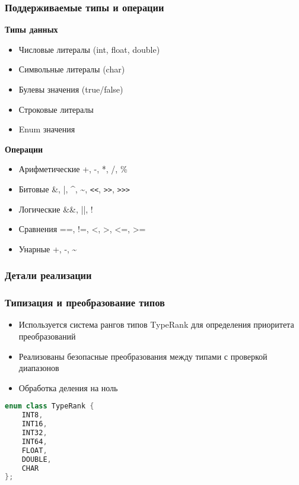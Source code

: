 \subsubsection{Поддерживаемые типы и операции}
\textbf{Типы данных}
\begin{itemize}[label={--}]
    \item Числовые литералы (int, float, double)
    \item Символьные литералы (char)
    \item Булевы значения (true/false)
    \item Строковые литералы
    \item Enum значения
\end{itemize}

\textbf{Операции}
\begin{itemize}[label={--}]
    \item Арифметические  +, -, *, /, \%
    \item Битовые  \&, |, \^{}, \~{}, \verb|<<|, \verb|>>|, \verb|>>>|
    \item Логические  \&\&, ||, !
    \item Сравнения  ==, !=, <, >, <=, >=
    \item Унарные  +, -, \~{}
\end{itemize}

\subsubsection{Детали реализации}
\subsubsection*{Типизация и преобразование типов}
\begin{itemize}[label={--}]
    \item Используется система рангов типов TypeRank для определения приоритета преобразований
    \item Реализованы безопасные преобразования между типами с проверкой диапазонов
    \item Обработка деления на ноль
\end{itemize}

\begin{lstlisting}[language=C++,caption=Перечисление рангов типов]
enum class TypeRank {
    INT8,
    INT16,
    INT32,
    INT64,
    FLOAT,
    DOUBLE,
    CHAR
};
\end{lstlisting}

